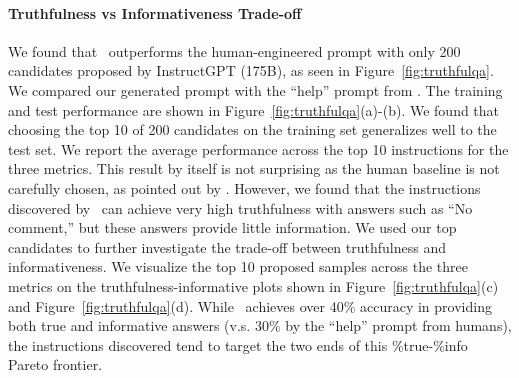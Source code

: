 {\paragraph{Truthfulness vs Informativeness Trade-off}
We found that \algname~outperforms the human-engineered prompt with only 200 candidates proposed by InstructGPT (175B), as seen in Figure~\ref{fig:truthfulqa}. We compared our generated prompt with the ``help'' prompt from \citet{lin2022truthfulqa}.
The training and test performance are shown in Figure~\ref{fig:truthfulqa}(a)-(b). We found that choosing the top 10 of 200 candidates on the training set generalizes well to the test set. We report the average performance across the top 10 instructions for the three metrics.
This result by itself is not surprising as the human baseline is not carefully chosen, as pointed out by \citet{askell2021general}. However, we found that the instructions discovered by \algname~can achieve very high truthfulness with answers such as ``No comment,'' but these answers provide little information. We used our top candidates to further investigate the trade-off between truthfulness and informativeness. We visualize the top 10 proposed samples across the three metrics on the truthfulness-informative plots shown in Figure~\ref{fig:truthfulqa}(c) and Figure~\ref{fig:truthfulqa}(d). While \algname~achieves over 40\% accuracy in providing both true and informative answers (v.s. 30\% by the ``help'' prompt from humans), the instructions discovered tend to target the two ends of this \%true-\%info Pareto frontier. 
}

